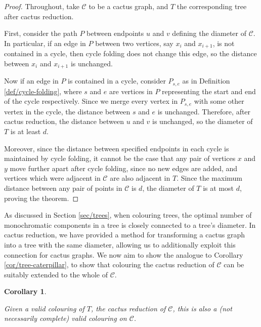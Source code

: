 \documentclass{mpaper}
\newtheorem{corollary}[theorem]{Corollary}
\begin{document}
\begin{proof}

Throughout, take $\mathcal{C}$ to be a cactus graph, and $T$ the corresponding tree after cactus reduction.
  
First, consider the path $P$ between endpoints $u$ and $v$ defining the diameter of $\mathcal{C}$. In particular, if an edge in $P$ between two vertices, say $x_i$ and $x_{i+1}$, is not contained in a cycle, then cycle folding does not change this edge, so the distance between $x_i$ and $x_{i+1}$ is unchanged.

Now if an edge in $P$ is contained in a cycle, consider $P_{s,e}$ as in Definition \ref{def/cycle-folding}, where $s$ and $e$ are vertices in $P$ representing the start and end of the cycle respectively. Since we merge every vertex in $P_{s,e}$ with some other vertex in the cycle, the distance between $s$ and $e$ is unchanged. Therefore, after cactus reduction, the distance between $u$ and $v$ is unchanged, so the diameter of $T$ is at least $d$.

Moreover, since the distance between specified endpoints in each cycle is maintained by cycle folding, it cannot be the case that any pair of vertices $x$ and $y$ move further apart after cycle folding, since no new edges are added, and vertices which were adjacent in $\mathcal{C}$ are also adjacent in $T$. Since the maximum distance between any pair of points in $\mathcal{C}$ is $d$, the diameter of $T$ is at most $d$, proving the theorem.
\end{proof}

As discussed in Section \ref{sec/trees}, when colouring trees, the optimal number of monochromatic components in a tree is closely connected to a tree's diameter. In cactus reduction, we have provided a method for transforming a cactus graph into a tree with the same diameter, allowing us to additionally exploit this connection for cactus graphs. We now aim to show the analogue to Corollary \ref{cor/tree-caterpillar}, to show that colouring the cactus reduction of $\mathcal{C}$ can be suitably extended to the whole of $\mathcal{C}$.

\begin{corollary}
\label{cor/colouring-extension}

Given a valid colouring of $T$, the cactus reduction of $\mathcal{C}$, this is also a (not necessarily complete) valid colouring on $\mathcal{C}$.
\end{corollary}
\end{document}
